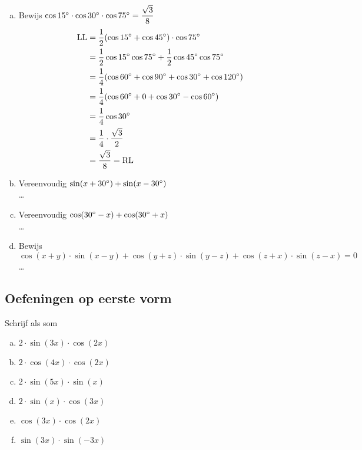 \documentclass[a4paper,12pt]{article}
\begin{document}
\begin{theorie}
\begin{enumerate}[(a)]
  \item Bewijs $\cos 15^\circ \cdot \cos 30^\circ \cdot \cos 75^\circ = \dfrac{\sqrt{3}}{8}$
  \begin{align*}
    \mbox{LL} &= \dfrac{1}{2}(\cos 15^\circ + \cos 45^\circ)\cdot \cos 75^\circ\\
              &= \dfrac{1}{2}\cos 15^\circ \cos 75^\circ + \dfrac{1}{2}\cos 45^\circ \cos 75^\circ\\
              &= \dfrac{1}{4}(\cos 60^\circ + \cos 90^\circ + \cos 30^\circ + \cos 120^\circ)\\
              &= \dfrac{1}{4}(\cos 60^\circ + 0 + \cos 30^\circ - \cos 60^\circ)\\
              &= \dfrac{1}{4}\cos 30^\circ\\
              &= \dfrac{1}{4}\cdot\dfrac{\sqrt{3}}{2}\\
              &= \dfrac{\sqrt{3}}{8} = \mbox{RL}
  \end{align*}
  \item Vereenvoudig $\sin(x+30^\circ)+\sin(x-30^\circ)$\\
  \ldots
  \item Vereenvoudig $\cos(30^\circ-x)+\cos(30^\circ+x)$\\
  \ldots
  \item Bewijs $\cos(x+y)\cdot\sin(x-y)+\cos(y+z)\cdot\sin(y-z)+\cos(z+x)\cdot\sin(z-x)=0$\\
  \ldots
\end{enumerate}

\pagebreak
\subsection{Oefeningen op eerste vorm}

\end{theorie}

\begin{oefening}
Schrijf als som
\begin{enumerate}[(a)]
\itemsep.5em
  \item $2\cdot \sin(3x)\cdot \cos(2x)$
  \item $2\cdot \cos(4x)\cdot \cos(2x)$
  \item $2\cdot \sin(5x)\cdot \sin(x)$
  \item $2\cdot \sin(x)\cdot \cos(3x)$
  \item $\cos(3x)\cdot \cos(2x)$
  \item $\sin(3x)\cdot \sin(-3x)$
\end{enumerate}
\end{oefening}
\end{document}
